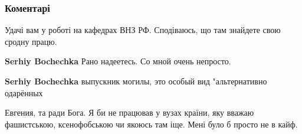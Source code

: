  
 
 
 
 
\subsubsection{Коментарі}
\label{sec:22_07_2021.fb.bilchenko_evgenia.1.uvolnenie.cmt}

\begin{itemize}
 
Удачі вам у роботі на кафедрах ВНЗ РФ. Сподіваюсь, що там знайдете свою сродну працю.

\begin{itemize}
 
\textbf{Serhiy Bochechka} Рано надеетесь. Со мной очень непросто.

 
\textbf{Serhiy Bochechka} выпускник могилы, это особый вид "альтернативно одарённых

 
Евгения, та ради Бога. Я би не працював у вузах країни, яку вважаю фашистською, ксенофобською чи якоюсь там іще. Мені було б просто не в кайф.

 

\end{itemize}
\end{itemize}
